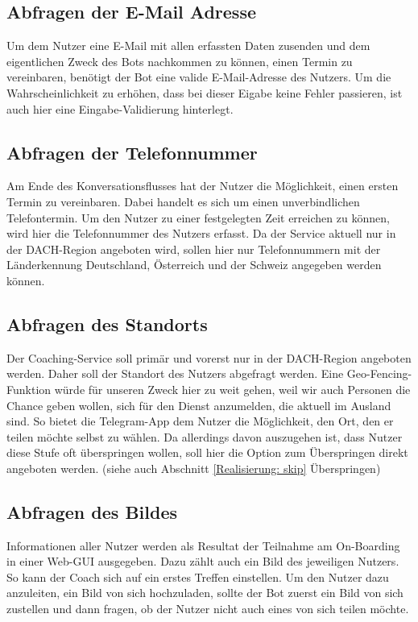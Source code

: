         \subsection{Abfragen der E-Mail Adresse}
            Um dem Nutzer eine E-Mail mit allen erfassten Daten zusenden und dem eigentlichen Zweck des Bots nachkommen zu können, einen Termin zu vereinbaren, benötigt der Bot eine valide E-Mail-Adresse des Nutzers. Um die Wahrscheinlichkeit zu erhöhen, dass bei dieser Eigabe keine Fehler passieren, ist auch hier eine Eingabe-Validierung hinterlegt.
        
        \subsection{Abfragen der Telefonnummer}
            Am Ende des Konversationsflusses hat der Nutzer die Möglichkeit, einen ersten Termin zu vereinbaren. Dabei handelt es sich um einen unverbindlichen Telefontermin. Um den Nutzer zu einer festgelegten Zeit erreichen zu können, wird hier die Telefonnummer des Nutzers erfasst. Da der Service aktuell nur in der DACH-Region angeboten wird, sollen hier nur Telefonnummern mit der Länderkennung Deutschland, Österreich und der Schweiz angegeben werden können. 
        
        \subsection{Abfragen des Standorts}
            Der Coaching-Service soll primär und vorerst nur in der DACH-Region angeboten werden. Daher soll der Standort des Nutzers abgefragt werden. Eine Geo-Fencing-Funktion würde für unseren Zweck hier zu weit gehen, weil wir auch Personen die Chance geben wollen, sich für den Dienst anzumelden, die aktuell im Ausland sind. So bietet die Telegram-App dem Nutzer die Möglichkeit, den Ort, den er teilen möchte selbst zu wählen. Da allerdings davon auszugehen ist, dass Nutzer diese Stufe oft überspringen wollen, soll hier die Option zum Überspringen direkt angeboten werden. (siehe auch Abschnitt \ref*{Realisierung: skip} Überspringen)
        
        \subsection{Abfragen des Bildes}
            Informationen aller Nutzer werden als Resultat der Teilnahme am On-Boarding in einer Web-GUI ausgegeben. Dazu zählt auch ein Bild des jeweiligen Nutzers. So kann der Coach sich auf ein erstes Treffen einstellen. Um den Nutzer dazu anzuleiten, ein Bild von sich hochzuladen, sollte der Bot zuerst ein Bild von sich zustellen und dann fragen, ob der Nutzer nicht auch eines von sich teilen möchte.
        
